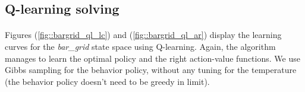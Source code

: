 \documentclass[a4paper]{report}
\begin{document}
{{{			}
			\subsection{Q-learning solving}
			{
			
				\paragraph{} Figures (\ref{fig::bargrid_ql_lc}) and (\ref{fig::bargrid_ql_ar}) display the learning curves for the \emph{bar\_grid} state space using Q-learning. Again, the algorithm manages to learn the optimal policy and the right action-value functions. We use Gibbs sampling for the behavior policy, without any tuning for the temperature (the behavior policy doesn't need to be greedy in limit). 

			}
		}
	}
	
\end{document}
